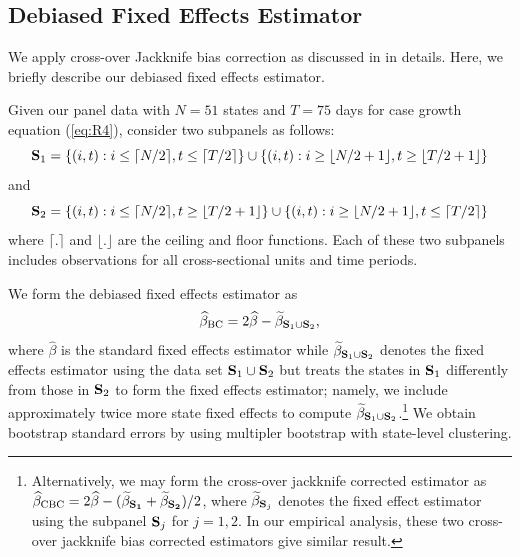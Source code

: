 \documentclass[11pt,reqno,letter]{amsart}
\theoremstyle{definition}
\begin{document}


\subsection{Debiased Fixed Effects Estimator}

We apply cross-over Jackknife bias correction as discussed in \cite{chen2020} in details. Here, we briefly describe our debiased fixed effects estimator.

Given our panel data with $N=51$ states and $T=75$ days  for case growth equation (\ref{eq:R4}), consider two subpanels as follows:
$$
{\bf S}_1 =  \{(i,t) :  i \leq \lceil N/2 \rceil,  t \leq \lceil T/2 \rceil \} \cup  \{(i,t) : i  \geq \lfloor N/2 + 1 \rfloor, t  \geq \lfloor T/2 + 1\rfloor \}
$$
and
$$
{\bf S}_2 =  \{(i,t) :  i \leq \lceil N/2 \rceil, t  \geq \lfloor T/2 + 1\rfloor \} \cup  \{(i,t) : i  \geq \lfloor N/2 + 1 \rfloor, t  \leq \lceil  T/2 \rceil \}
$$
where $\lceil . \rceil$  and  $\lfloor . \rfloor$ are the ceiling and floor functions.  Each of these two subpanels includes observations for all cross-sectional units and time periods.

We form the debiased fixed effects estimator as
$$
\widehat \beta_{\rm BC}  =  2 \widehat \beta -  \widetilde \beta_{{\bf S}_1\cup{\bf S}_2},
$$
where $\widehat \beta$ is the standard fixed effects estimator while $\widetilde \beta_{{\bf S}_1\cup{\bf S}_2}$ denotes the fixed effects estimator using the data set  ${\bf S}_1\cup{\bf S}_2$ but treats the states in  ${\bf S}_1$ differently from those in  ${\bf S}_2$ to form the fixed effects estimator; namely, we include approximately twice more state fixed effects to compute $\widetilde \beta_{{\bf S}_1\cup{\bf S}_2}$.\footnote{Alternatively, we may form the cross-over jackknife corrected estimator as $\widehat \beta_{\rm CBC}  =  2 \widehat \beta -  (\widetilde \beta_{{\bf S_1}}+\widetilde \beta_{{\bf S_2}})/2$, where $\widetilde \beta_{{\bf S}_j}$ denotes the fixed effect estimator using the subpanel  ${\bf S}_j$ for $j=1,2$. In our empirical analysis, these two cross-over jackknife bias corrected estimators give  similar result.} We obtain bootstrap standard errors by using multipler bootstrap with state-level clustering.
\end{document}
